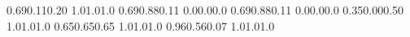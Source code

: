 \documentclass[a5paper,9pt]{scrreprt}
\begin{document}
\thispagestyle{empty}

\setslotsize{4.44cm}{0.203cm}
\settextframe{0.8mm}

\seteventcornerradius{0pt}


  {0.69}{0.11}{0.20}   {1.0}{1.0}{1.0}  %
  {0.69}{0.88}{0.11}   {0.0}{0.0}{0.0}  %
 {0.69}{0.88}{0.11}   {0.0}{0.0}{0.0}  %
 {0.35}{0.00}{0.50}   {1.0}{1.0}{1.0}  %
     {0.65}{0.65}{0.65}   {1.0}{1.0}{1.0}  %
 {0.96}{0.56}{0.07}   {1.0}{1.0}{1.0}  %
\end{document}
